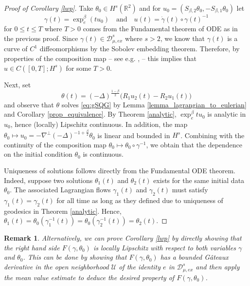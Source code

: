 \documentclass[11pt]{amsart}
\numberwithin{equation}{section}
\newtheorem{remark}[theorem]{Remark}
\begin{document}
    
	\begin{proof}[Proof of Corollary \ref{lwp}]
		Take $\theta_0 \in H^s(\mathbb R^2)$ and for $u_0=(S_{\beta,2}\theta_{0},-S_{\beta,1}\theta_{0})$ let
		\[
		\gamma(t)=\exp_e^{\beta}(t u_0) \quad \mbox{and} \quad u(t)=	\dot{\gamma}(t) \circ 	\gamma(t)^{-1}
		\]
		for $0\le t \le T$ where $T>0$ comes from the Fundamental theorem of ODE as in the previous proof. Since $\gamma(t)\in \mathcal{D}_{\mu,ex}^s$ where $s>2$, we know that $\gamma(t)$ is a curve of $C^1$ diffeomorphisms by the Sobolev embedding theorem. Therefore, by properties of the composition map -- see e.g. \cite{EbMa}, \cite{Inci_K_T2013} -- this implies that $u \in C([0,T];H^s)$ for some $T > 0$. 
        
        Next, set
		\[
		\theta(t) = (-\Delta)^{\frac{1-\beta}{2}}\Big( R_1 u_2(t)-R_2 u_1(t) \Big)
		\]
		and observe that $\theta$ solves \eqref{eq:gSQG} by Lemma \ref{lemma_lagrangian_to_eulerian} and Corollary \ref{prop_equivalence}. By Theorem \ref{analytic}, $\exp_{e}^{\beta}tu_0$ is analytic in $u_0$, hence (locally) Lipschitz continuous.
        In addition, the map $\theta_0\mapsto u_0=-\nabla^{\perp}(-\Delta)^{-1+\frac{\beta}{2}}\theta_0$ is linear and bounded in $H^s$.
        Combining with the continuity of the composition map $\theta_0\mapsto \theta_0\circ \gamma^{-1}$, we obtain that the dependence on the initial condition $\theta_0$ is continuous.
        
        Uniqueness of solutions follows directly from the Fundamental ODE theorem. Indeed, suppose two solutions $\theta_1(t)$ and $\theta_2(t)$ exists for the same initial data $\theta_0$. The associated Lagrangian flows $\gamma_1(t)$ and $\gamma_2(t)$ must satisfy $\gamma_1(t)=\gamma_2(t)$ for all time as long as they defined due to uniqueness of geodesics in Theorem \ref{analytic}. Hence, $\theta_1(t)=\theta_0(\gamma_1^{-1}(t))=\theta_0(\gamma_2^{-1}(t))=\theta_2(t).$ 
	\end{proof}

\begin{remark}
    Alternatively, we can prove Corollary \ref{lwp} by directly showing that the right hand side $F(\gamma,\theta_0)$ is locally Lipschitz with respect to both variables $\gamma$ and $\theta_0$. This can be done by showing that $F(\gamma,\theta_0)$ has a bounded G\^ateaux derivative in the open neighborhood $\mathcal{U}$ of the identity $e$ in $\mathcal{D}_{\mu,ex}^s$ and then apply the mean value estimate to deduce the desired property of $F(\gamma,\theta_0)$.

\end{remark}
\end{document}

